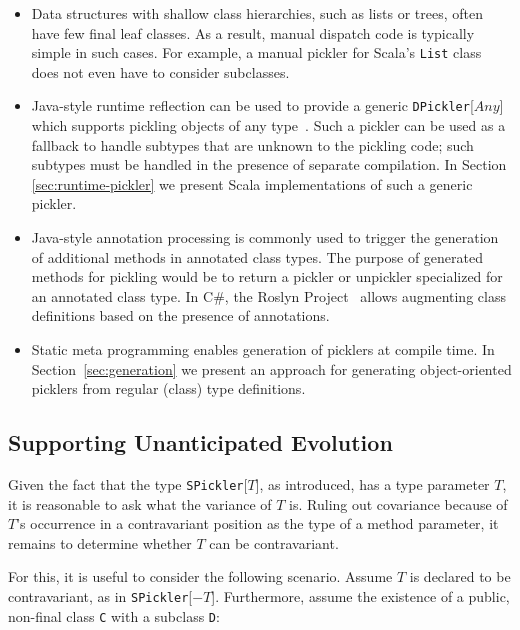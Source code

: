 \documentclass[preprint,10pt]{sigplanconf}
\theoremstyle{definition}
\theoremstyle{definition}
\newcommand{\term}[1]{\mbox{\texttt{#1}}}
\begin{document}
\begin{itemize}
\item Data structures with shallow class hierarchies, such as lists or trees,
often have few final leaf classes. As a result, manual dispatch code is
typically simple in such cases. For example, a manual pickler for Scala's
\term{List} class does not even have to consider subclasses.

\item Java-style runtime reflection can be used to provide a generic
\term{DPickler}[$Any$] which supports pickling objects of any
type~\cite{JavaSerialization,Philippsen2000}. Such a pickler can be used as a
fallback to handle subtypes that are unknown to the pickling code; such
subtypes must be handled in the presence of separate compilation. In
Section \ref{sec:runtime-pickler} we present Scala implementations of such a
generic pickler.

\item Java-style annotation processing is commonly used to trigger the
generation of additional methods in annotated class types. The purpose of
generated methods for pickling would be to return a pickler or unpickler
specialized for an annotated class type. In C\#, the Roslyn
Project~\cite{Roslyn} allows augmenting class definitions based on the
presence of annotations.

\item Static meta programming \cite{Burmako2012,Nemerle} enables generation of
picklers at compile time. In Section~\ref{sec:generation} we present an
approach for generating object-oriented picklers from regular (class) type
definitions.
\end{itemize}

\subsection{Supporting Unanticipated Evolution}

Given the fact that the type \term{SPickler}[$T$], as introduced, has a type
parameter $T$, it is reasonable to ask what the variance of $T$ is. Ruling out
covariance because of $T$'s occurrence in a contravariant position as the type
of a method parameter, it remains to determine whether $T$ can be
contravariant.

For this, it is useful to consider the following scenario. Assume $T$ is
declared to be contravariant, as in \term{SPickler}[$-T$]. Furthermore, assume
the existence of a public, non-final class \term{C} with a subclass \term{D}:
\end{document}
